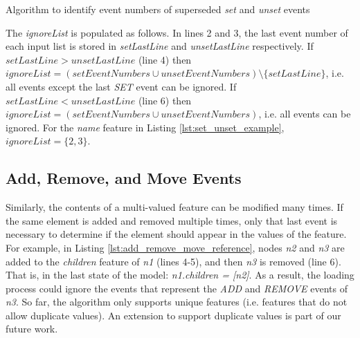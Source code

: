\documentclass{llncs}
\begin{document}
    \IncMargin{1.4em}
    \begin{algorithm}[H]
        \begin{small}
        \end{small}
        \caption{Algorithm to identify event numbers of superseded \emph{set} and \emph{unset} events}
        \label{alg:set_unset_optimisation}
    \end{algorithm}
    \DecMargin{1.4em}
    
    The \emph{ignoreList} is populated as follows.
    In lines 2 and 3, the last event number of each input list is stored in \emph{setLastLine} and \emph{unsetLastLine} respectively.
    If $setLastLine > unsetLastLine$ (line 4) then $ignoreList = (setEventNumbers \cup unsetEventNumbers) \setminus  \{setLastLine\} $, i.e. all events except the last \emph{SET} event can be ignored.
    If $setLastLine < unsetLastLine$ (line 6) then $ignoreList = (setEventNumbers \cup unsetEventNumbers)$, i.e. all events can be ignored.
    For the \emph{name} feature in Listing \ref{lst:set_unset_example}, $ignoreList = \{2, 3\}$.
    
    \subsection{Add, Remove, and Move Events}\label{subsec:add_remove_and_move_operations}
    Similarly, the contents of a multi-valued feature can be modified many times.
    If the same element is added and removed multiple times,  only that last event is necessary to determine if the element should appear in the values of the feature.
    For example, in Listing \ref{lst:add_remove_move_reference},  nodes \emph{n2} and \emph{n3} are added to the \emph{children} feature of \emph{n1} (lines 4-5), and then \emph{n3} is removed (line 6).
    That is, in the last state of the model: \emph{n1.children = [n2]}.
    As a result, the loading process could ignore the events that represent the \emph{ADD} and \emph{REMOVE} events of \emph{n3}. So far, the algorithm only supports unique features (i.e. features that do not allow duplicate values). An extension to support duplicate values is part of our future work. 
    
\end{document}
